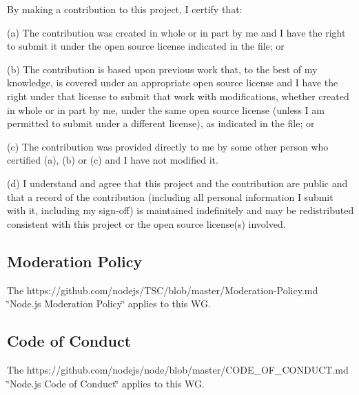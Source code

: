 By making a contribution to this project, I certify that\+:


\begin{DoxyItemize}
\item (a) The contribution was created in whole or in part by me and I have the right to submit it under the open source license indicated in the file; or
\item (b) The contribution is based upon previous work that, to the best of my knowledge, is covered under an appropriate open source license and I have the right under that license to submit that work with modifications, whether created in whole or in part by me, under the same open source license (unless I am permitted to submit under a different license), as indicated in the file; or
\item (c) The contribution was provided directly to me by some other person who certified (a), (b) or (c) and I have not modified it.
\item (d) I understand and agree that this project and the contribution are public and that a record of the contribution (including all personal information I submit with it, including my sign-\/off) is maintained indefinitely and may be redistributed consistent with this project or the open source license(s) involved.
\end{DoxyItemize}

\subsection*{Moderation Policy}

The https\+://github.com/nodejs/\+T\+S\+C/blob/master/\+Moderation-\/\+Policy.\+md \char`\"{}\+Node.\+js Moderation Policy\char`\"{} applies to this WG.

\subsection*{Code of Conduct}

The https\+://github.com/nodejs/node/blob/master/\+C\+O\+D\+E\+\_\+\+O\+F\+\_\+\+C\+O\+N\+D\+U\+C\+T.\+md \char`\"{}\+Node.\+js Code of Conduct\char`\"{} applies to this WG. 